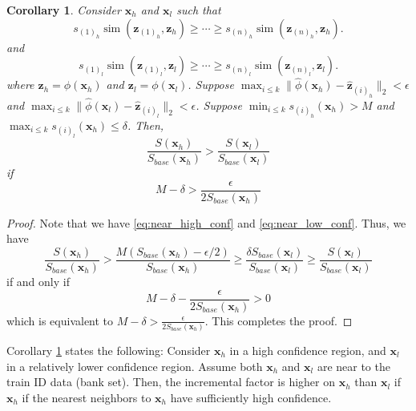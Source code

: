 \documentclass[10pt,twocolumn,letterpaper]{article}
\newtheorem{cor}[thm]{Corollary}
\DeclareMathOperator{\simop}{sim}
\begin{document}
\begin{cor}
\label{thm:theory_cor}
Consider $\mathbf{x}_h$ and $\mathbf{x}_l$ such that
\begin{equation}
s_{(1)_{h}} \simop ( \mathbf{z}_{(1)_{h}}, \mathbf{z}_h) \geq \cdots \geq s_{(n)_h} \simop ( \mathbf{z}_{(n)_h}, \mathbf{z}_h).
\end{equation}
and
\begin{equation}
s_{(1)_{l}} \simop ( \mathbf{z}_{(1)_{l}}, \mathbf{z}_l) \geq \cdots \geq s_{(n)_l} \simop ( \mathbf{z}_{(n)_l}, \mathbf{z}_l).
\end{equation}
where $\mathbf{z}_h = \phi(\mathbf{x}_h)$ and $\mathbf{z}_l = \phi(\mathbf{x}_l)$.
Suppose
$\max_{i \leq k} \lVert \widehat{\phi}(\mathbf{x}_h) - \widehat{\mathbf{z}}_{(i)_h}\rVert_2 < \epsilon$ and $\max_{i \leq k} \lVert \widehat{\phi}(\mathbf{x}_l) - \widehat{\mathbf{z}}_{(i)_l}\rVert_2 < \epsilon$.
Suppose 
$\min_{i \leq k} s_{(i)_h}(\mathbf{x}_h) > M$
and
$\max_{i \leq k} s_{(i)_l}(\mathbf{x}_h) \leq \delta$. Then,
\begin{equation}
\frac{S(\mathbf{x}_h)}{S_{base}(\mathbf{x}_h)}
>
\frac{S(\mathbf{x}_l)}{S_{base}(\mathbf{x}_l)}
\end{equation}
if 
\begin{equation}
M - \delta > \frac{\epsilon}{2 S_{base}(\mathbf{x}_h)}
\end{equation}
\end{cor}

\begin{proof}
Note that we have \eqref{eq:near_high_conf} and \eqref{eq:near_low_conf}.
Thus, we have 
\begin{equation}
\frac{S(\mathbf{x}_h)}{S_{base}(\mathbf{x}_h)}
> 
\frac{M(S_{base}(\mathbf{x}_h) - \epsilon/2)}{S_{base}(\mathbf{x}_h)}
\geq
\dfrac{\delta S_{base}(\mathbf{x}_l)}{S_{base}(\mathbf{x}_l)}
\geq
\frac{S(\mathbf{x}_l)}{S_{base}(\mathbf{x}_l)}
\end{equation}
if and only if
\begin{equation}
M - \delta - \frac{\epsilon}{2 S_{base}(\mathbf{x}_h)} > 0
\end{equation}
which is equivalent to $M-\delta > \frac{\epsilon}{2 S_{base}(\mathbf{x}_h)}$. This completes the proof.
\end{proof}

Corollary \ref{thm:theory_cor} states the following: Consider $\mathbf{x}_h$ in a high confidence region, and $\mathbf{x}_l$ in a relatively lower confidence region. Assume both $\mathbf{x}_h$ and $\mathbf{x}_l$ are near to the train ID data (\ie bank set). Then, the incremental factor is higher on $\mathbf{x}_h$ than $\mathbf{x}_l$ if $\mathbf{x}_h$ if the nearest neighbors to $\mathbf{x}_h$ have sufficiently high confidence.
\end{document}

